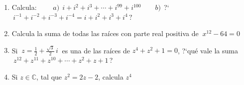 \begin{enumerate}
\vspace{-6mm}
\begin{flushright}
\begin{footnotesize} \textcolor{gris}{}	\end{footnotesize}
\end{flushright}

\item	Calcula: $\qquad a)\ \ i+i^2+i^3+\cdots +i^{99}+i^{100} \qquad b)\ \ $?`$\, i^{-1}+i^{-2}+i^{-3}+i^{-4}=i+i^2+i^3+i^4 \, ?$

\vspace{-6mm}
\begin{flushright}
\begin{footnotesize} \textcolor{gris}{}	\end{footnotesize}
\end{flushright}

\item	Calcula la suma de todas las raíces con parte real positiva de $\ x^{12}-64=0$

\vspace{-6mm}
\begin{flushright}
\begin{footnotesize} \textcolor{gris}{}	\end{footnotesize}
\end{flushright}

\item	Si $\ z=\frac 1 2+\frac{\sqrt{3}}{2}\, i \ $ es una de las raíces de $z^4+z^2+1=0$, ?`qué vale la suma $\ z^{12}+z^{11}+z^{10}+\cdots +z^2+z+1\, $? 

\vspace{-6mm}
\begin{flushright}
\begin{footnotesize} \textcolor{gris}{}	\end{footnotesize}
\end{flushright}

\item	Si $z\in \mathbb C$, tal que $z^2=2z-2$, calcula $z^4$ 

\vspace{-6mm}
\begin{flushright}
\begin{footnotesize} \textcolor{gris}{}	\end{footnotesize}
\end{flushright}


\end{enumerate}


